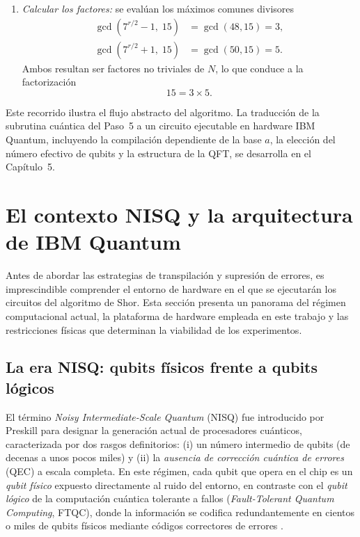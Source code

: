 \documentclass[12pt, spanish]{book}
\begin{document}
\begin{enumerate}
\item \textit{Calcular los factores:} se evalúan los máximos comunes divisores
\begin{align*}
    \gcd(7^{r/2} - 1,\; 15) & = \gcd(48, 15) = 3, \\
    \gcd(7^{r/2} + 1,\; 15) & = \gcd(50, 15) = 5.
\end{align*}
Ambos resultan ser factores no triviales de $N$, lo que conduce a la factorización
\[
    15 = 3 \times 5.
\]
\end{enumerate}

Este recorrido ilustra el flujo abstracto del algoritmo. La traducción de la subrutina cuántica del Paso~5 a un circuito ejecutable en hardware IBM Quantum, incluyendo la compilación dependiente de la base $a$, la elección del número efectivo de qubits y la estructura de la QFT, se desarrolla en el Capítulo~5.

\section{El contexto NISQ y la arquitectura de IBM Quantum}
\label{sec:contexto_nisq}

Antes de abordar las estrategias de transpilación y supresión de errores, es imprescindible comprender el entorno de hardware en el que se ejecutarán los circuitos del algoritmo de Shor. Esta sección presenta un panorama del régimen computacional actual, la plataforma de hardware empleada en este trabajo y las restricciones físicas que determinan la viabilidad de los experimentos.

\subsection{La era NISQ: qubits físicos frente a qubits lógicos}

El término \textit{Noisy Intermediate-Scale Quantum} (NISQ) fue introducido por Preskill \cite{Preskill} para designar la generación actual de procesadores cuánticos, caracterizada por dos rasgos definitorios: (i) un número intermedio de qubits (de decenas a unos pocos miles) y (ii) la \textit{ausencia de corrección cuántica de errores} (QEC) a escala completa. En este régimen, cada qubit que opera en el chip es un \textit{qubit físico} expuesto directamente al ruido del entorno, en contraste con el \textit{qubit lógico} de la computación cuántica tolerante a fallos (\textit{Fault-Tolerant Quantum Computing}, FTQC), donde la información se codifica redundantemente en cientos o miles de qubits físicos mediante códigos correctores de errores \cite{Roffe2019}.\\
\end{document}
